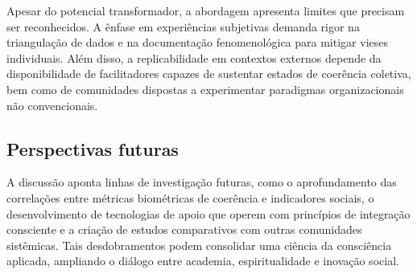 Apesar do potencial transformador, a abordagem apresenta limites que
precisam ser reconhecidos. A ênfase em experiências subjetivas demanda
rigor na triangulação de dados e na documentação fenomenológica para
mitigar vieses individuais. Além disso, a replicabilidade em contextos
externos depende da disponibilidade de facilitadores capazes de sustentar
estados de coerência coletiva, bem como de comunidades dispostas a
experimentar paradigmas organizacionais não convencionais.

\subsection{Perspectivas futuras}

A discussão aponta linhas de investigação futuras, como o
aprofundamento das correlações entre métricas biométricas de coerência e
indicadores sociais, o desenvolvimento de tecnologias de apoio que
operem com princípios de integração consciente e a criação de estudos
comparativos com outras comunidades sistêmicas. Tais desdobramentos
podem consolidar uma ciência da consciência aplicada, ampliando o diálogo
entre academia, espiritualidade e inovação social.

\newpage
